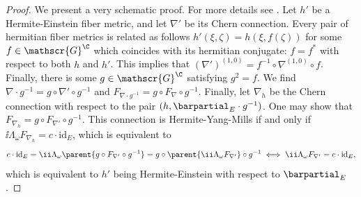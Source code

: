 \begin{proof}
    We present a very schematic proof. For more details see \parencite[Sec. 1.1]{LarsMartin_Notes_HK}. Let \(h'\) be a Hermite-Einstein fiber metric, and let \(\nabla'\) be its Chern connection. Every pair of hermitian fiber metrics is related as follows \(h'(\xi, \zeta)=h(\xi, f(\zeta))\) for some \(f \in \mathscr{G}^\C\) which coincides with its hermitian conjugate: \(f=f^*\) with respect to both \(h\) and \(h'\). This implies that \((\nabla')^{(1,0)}=f^{-1}\circ \nabla^{(1,0)}\circ f\). Finally, there is some \(g\in \mathscr{G}^\C\) satisfying \(g^2=f\). We find \(\nabla\cdot g^{-1}=g \circ \nabla '\circ g^{-1}\) and \(F_{\nabla \cdot g^{-1}}=g\circ F_\nabla \circ g^{-1}\). Finally, let \(\nabla_h\) be the Chern connection with respect to the pair \((h, \barpartial_E \cdot g^{-1})\). One may show that \(F_{\nabla_h}=g \circ F_{\nabla'}\circ g^{-1}\). This connection is Hermite-Yang-Mills if and only if \(\ii \Lambda_\omega F_{\nabla_h}=c \cdot \mathrm{id}_E\), which is equivalent to
    \[
    c \cdot \mathrm{id}_E=\ii \Lambda_\omega \parent{g \circ F_{\nabla'} \circ g^{-1}}=g \circ \parent{\ii \Lambda_\omega F_{\nabla'}}\circ g^{-1} \iff  \ii \Lambda_\omega F_{\nabla'}=c\cdot \mathrm{id}_E,
    \]
    which is equivalent to \(h'\) being Hermite-Einstein with respect to \(\barpartial_E\).
\end{proof}

